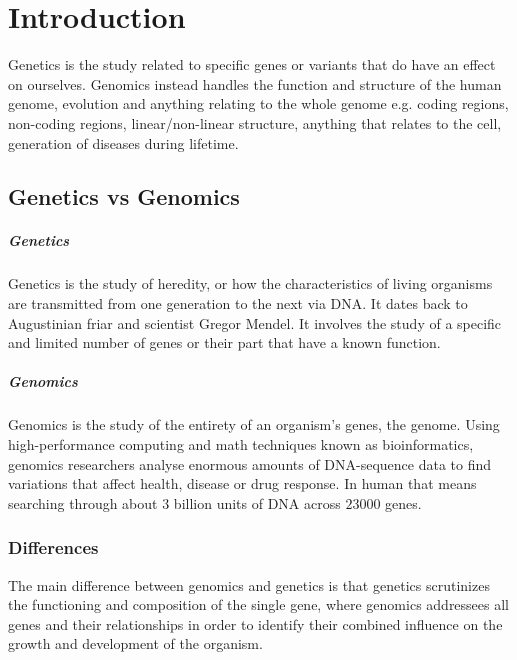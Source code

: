 \graphicspath{{chapters/01/}}
\chapter{Introduction}
Genetics is the study related to specific genes or variants that do have an effect on ourselves.
Genomics instead handles the function and structure of the human genome, evolution and anything relating to the whole genome e.g. coding regions, non-coding regions, linear/non-linear structure, anything that relates to the cell, generation of diseases during lifetime.


\section{Genetics vs Genomics}
	
	\paragraph*{Genetics}
	Genetics is the study of heredity, or how the characteristics of living organisms are transmitted from one generation to the next via DNA.
	It dates back to Augustinian friar and scientist Gregor Mendel.
	It involves the study of a specific and limited number of genes or their part that have a known function.

	\paragraph*{Genomics}
	Genomics is the study of the entirety of an organism's genes, the genome.
	Using high-performance computing and math techniques known as bioinformatics, genomics researchers analyse enormous amounts of DNA-sequence data to find variations that affect health, disease or drug response.
	In human that means searching through about $3$ billion units of DNA across $23000$ genes.

	\subsection{Differences}
	The main difference between genomics and genetics is that genetics scrutinizes the functioning and composition of the single gene, where genomics addressees all genes and their relationships in order to identify their combined influence on the growth and development of the organism.

